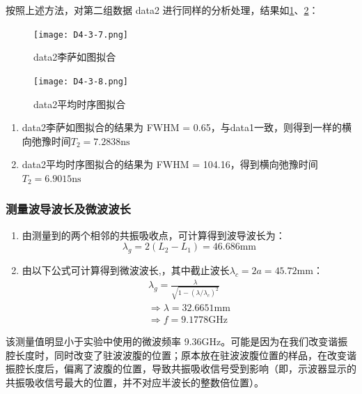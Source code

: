 \documentclass[dvipsnames, svgnames,a4paper,11pt]{article}
\begin{document}
		按照上述方法，对第二组数据 data2 进行同样的分析处理，结果如\cref{fig:D4-3-7}、\cref{fig:D4-3-8}：
		\begin{figure}[htbp]
			\centering
			\texttt{[image: D4-3-7.png]}
			\caption{data2李萨如图拟合}
			\label{fig:D4-3-7}
		\end{figure}
		\begin{figure}[htbp]
			\centering
			\texttt{[image: D4-3-8.png]}
			\caption{data2平均时序图拟合}
			\label{fig:D4-3-8}
		\end{figure}

		\begin{enumerate}
			\item data2李萨如图拟合的结果为 FWHM = 0.65，与data1一致，则得到一样的横向弛豫时间$T_2 = 7.2838 \mathrm{ns}$
			\item data2平均时序图拟合的结果为 FWHM = 104.16，得到横向弛豫时间$T_2 = 6.9015 \mathrm{ns}$
		\end{enumerate}









	\subsubsection{测量波导波长及微波波长}

		\begin{enumerate}
			\item 由测量到的两个相邻的共振吸收点，可计算得到波导波长为：
				\[
					\lambda_g = 2 (L_2 - L_1) = 46.686 \mathrm{mm}
				\]

			\item 由以下公式可计算得到微波波长,，其中截止波长$\lambda_c = 2a = 45.72 \mathrm{mm}$：
				\begin{align*}
					\lambda_g = \frac{\lambda}{\sqrt{1 - (\lambda / \lambda_c)^2}}	\nonumber	\\
					\Rightarrow	\lambda = 32.6651 \mathrm{mm}	\nonumber	\\
					\Rightarrow f = 9.1778 \mathrm{GHz}	\nonumber
				\end{align*}
		\end{enumerate}

		该测量值明显小于实验中使用的微波频率 9.36GHz。可能是因为在我们改变谐振腔长度时，同时改变了驻波波腹的位置；原本放在驻波波腹位置的样品，在改变谐振腔长度后，偏离了波腹的位置，导致共振吸收信号受到影响（即，示波器显示的共振吸收信号最大的位置，并不对应半波长的整数倍位置）。
\end{document}
